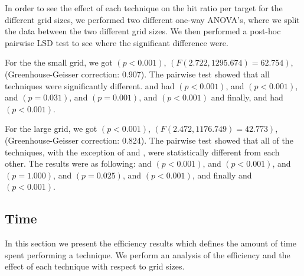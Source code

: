 In order to see the effect of each technique on the hit ratio per target for the different grid sizes, we performed two different one-way ANOVA's, where we split the data between the two different grid sizes.
We then performed a post-hoc pairwise LSD test to see where the significant difference were.
 
For the the small grid, we got $(p<0.001)$, $(F(2.722, 1295.674)=62.754)$, (Greenhouse-Geisser correction: 0.907).
The pairwise test showed that all techniques were significantly different. \pinch and \swipe had $(p < 0.001)$, \pinch and \throw $(p <0.001)$, \pinch and \tilt $(p = 0.031)$, \swipe and \throw $(p=0.001)$, \swipe and \tilt $(p < 0.001)$ and finally, \throw and \tilt had $(p<0.001)$. 

For the large grid, we got $(p<0.001)$, $(F(2.472, 1176.749)=42.773)$, (Greenhouse-Geisser correction: 0.824).
The pairwise test showed that all of the techniques, with the exception of \pinch and \tilt, were statistically different from each other. The results were as following: \pinch and \swipe $(p<0.001)$, \pinch and \throw $(p<0.001)$, \pinch and \tilt $(p=1.000)$, \swipe and \throw $(p=0.025)$, \swipe and \tilt $(p<0.001)$, and finally \throw and \tilt $(p<0.001)$.

\subsection{Time}
In this section we present the efficiency results which defines the amount of time spent performing a technique.
We perform an analysis of the efficiency and the effect of each technique with respect to grid sizes.

